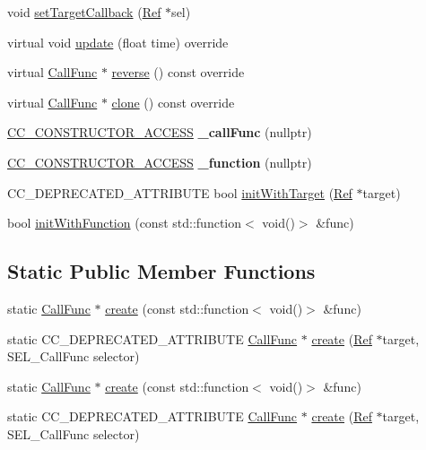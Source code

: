 \begin{DoxyCompactItemize}
\item 
void \hyperlink{classCallFunc_af44a55cfb845edb38e1c7963e2a6646f}{set\+Target\+Callback} (\hyperlink{classRef}{Ref} $\ast$sel)
\item 
virtual void \hyperlink{classCallFunc_a6684fe74294f93ba202ae8599e890c0c}{update} (float time) override
\item 
virtual \hyperlink{classCallFunc}{Call\+Func} $\ast$ \hyperlink{classCallFunc_aed2cda04eeffe75361b92ef8b15127eb}{reverse} () const override
\item 
virtual \hyperlink{classCallFunc}{Call\+Func} $\ast$ \hyperlink{classCallFunc_a29d4c56d05c63d066a99601c7f9e32cc}{clone} () const override
\item 
\mbox{\label{classCallFunc_a31c739695ae40a970ae5886376855e0e}} 
\hyperlink{_2cocos2d_2cocos_2base_2ccConfig_8h_a25ef1314f97c35a2ed3d029b0ead6da0}{C\+C\+\_\+\+C\+O\+N\+S\+T\+R\+U\+C\+T\+O\+R\+\_\+\+A\+C\+C\+E\+SS} {\bfseries \+\_\+call\+Func} (nullptr)
\item 
\mbox{\label{classCallFunc_a4c6a9381c54375506adccee11d0478c4}} 
\hyperlink{_2cocos2d_2cocos_2base_2ccConfig_8h_a25ef1314f97c35a2ed3d029b0ead6da0}{C\+C\+\_\+\+C\+O\+N\+S\+T\+R\+U\+C\+T\+O\+R\+\_\+\+A\+C\+C\+E\+SS} {\bfseries \+\_\+function} (nullptr)
\item 
C\+C\+\_\+\+D\+E\+P\+R\+E\+C\+A\+T\+E\+D\+\_\+\+A\+T\+T\+R\+I\+B\+U\+TE bool \hyperlink{classCallFunc_a51f7e093c6545c07ecd85a5ef69d3625}{init\+With\+Target} (\hyperlink{classRef}{Ref} $\ast$target)
\item 
bool \hyperlink{classCallFunc_ab6ad237cb23e996abc60f35ad5091233}{init\+With\+Function} (const std\+::function$<$ void()$>$ \&func)
\end{DoxyCompactItemize}
\subsection*{Static Public Member Functions}
\begin{DoxyCompactItemize}
\item 
static \hyperlink{classCallFunc}{Call\+Func} $\ast$ \hyperlink{classCallFunc_a810abdb71d71e69c7dfa7c0704152878}{create} (const std\+::function$<$ void()$>$ \&func)
\item 
static C\+C\+\_\+\+D\+E\+P\+R\+E\+C\+A\+T\+E\+D\+\_\+\+A\+T\+T\+R\+I\+B\+U\+TE \hyperlink{classCallFunc}{Call\+Func} $\ast$ \hyperlink{classCallFunc_a4c5cbd1f08044f6e988abe5bb5c1a389}{create} (\hyperlink{classRef}{Ref} $\ast$target, S\+E\+L\+\_\+\+Call\+Func selector)
\item 
static \hyperlink{classCallFunc}{Call\+Func} $\ast$ \hyperlink{classCallFunc_ad572341c92990e1ff453fbc813990c59}{create} (const std\+::function$<$ void()$>$ \&func)
\item 
static C\+C\+\_\+\+D\+E\+P\+R\+E\+C\+A\+T\+E\+D\+\_\+\+A\+T\+T\+R\+I\+B\+U\+TE \hyperlink{classCallFunc}{Call\+Func} $\ast$ \hyperlink{classCallFunc_a84431b4446e35dcf16647c651235f722}{create} (\hyperlink{classRef}{Ref} $\ast$target, S\+E\+L\+\_\+\+Call\+Func selector)
\end{DoxyCompactItemize}
